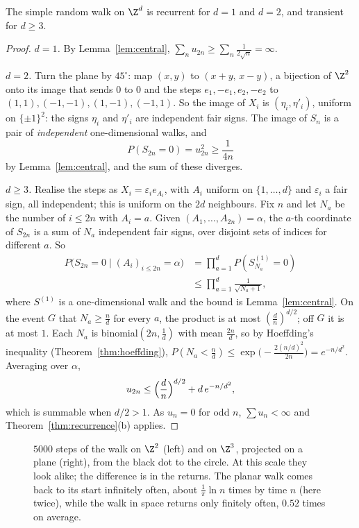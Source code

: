 \begin{theorem}[Pólya, 1921]\label{thm:polya}
The simple random walk on $\Z^d$ is recurrent for $d=1$ and $d=2$, and transient for $d\ge3$.
\end{theorem}
\begin{proof}
\emph{$d=1$.} By Lemma~\ref{lem:central}, $\sum_nu_{2n}\ge\sum_n\frac1{2\sqrt n}=\infty$.

\emph{$d=2$.} Turn the plane by $45^\circ$: map $(x,y)$ to $(x+y,\,x-y)$, a bijection of $\Z^2$ onto its image that sends $0$ to $0$ and the steps
$e_1,-e_1,e_2,-e_2$ to $(1,1),(-1,-1),(1,-1),(-1,1)$. So the image of $X_i$ is $(\eta_i,\eta'_i)$, uniform on $\{\pm1\}^2$: the signs $\eta_i$ and $\eta'_i$ are
independent fair signs. The image of $S_n$ is a pair of \emph{independent} one-dimensional walks, and
\[
P(S_{2n}=0)=u_{2n}^2\ge\frac1{4n}
\]
by Lemma~\ref{lem:central}, and the sum of these diverges.

\emph{$d\ge3$.} Realise the steps as $X_i=\varepsilon_ie_{A_i}$, with $A_i$ uniform on $\{1,\dots,d\}$ and $\varepsilon_i$ a fair sign, all independent; this is
uniform on the $2d$ neighbours. Fix $n$ and let $N_a$ be the number of $i\le2n$ with $A_i=a$. Given $(A_1,\dots,A_{2n})=\alpha$, the $a$-th
coordinate of $S_{2n}$ is a sum of $N_a$ independent fair signs, over disjoint sets of indices for different $a$. So
\[
\begin{aligned}P\bigl(S_{2n}=0\mid(A_i)_{i\le2n}=\alpha\bigr)&=\prod_{a=1}^dP(S^{(1)}_{N_a}=0)\\&\le\prod_{a=1}^d\frac1{\sqrt{N_a+1}},\end{aligned}
\]
where $S^{(1)}$ is a one-dimensional walk and the bound is Lemma~\ref{lem:central}. On the event $G$ that $N_a\ge\frac nd$ for every $a$, the product
is at most $(\frac dn)^{d/2}$; off $G$ it is at most $1$. Each $N_a$ is binomial$(2n,\frac1d)$ with mean $\frac{2n}d$, so by Hoeffding's inequality
(Theorem~\ref{thm:hoeffding}), $P(N_a<\frac nd)\le\exp\bigl(-\frac{2(n/d)^2}{2n}\bigr)=e^{-n/d^2}$. Averaging over $\alpha$,
\[
u_{2n}\le\Bigl(\frac dn\Bigr)^{d/2}+d\,e^{-n/d^2},
\]
which is summable when $d/2>1$. As $u_n=0$ for odd $n$, $\sum u_n<\infty$ and Theorem~\ref{thm:recurrence}(b) applies.
\end{proof}

\begin{figure}[ht]
\centering
{}
\caption{$5000$ steps of the walk on $\Z^2$ (left) and on $\Z^3$, projected on a plane (right), from the black dot to the circle. At
this scale they look alike; the difference is in the returns. The planar walk comes back to its start infinitely often,
about $\frac1\pi\ln n$ times by time $n$ (here twice), while the walk in space returns only finitely often, $0.52$ times on average.}
\label{fig:walks}
\end{figure}


